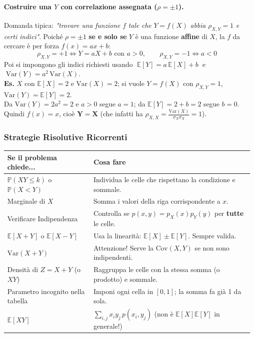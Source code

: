 \documentclass[12pt]{extarticle} %
\begin{document}
\paragraph{Costruire una $Y$ con correlazione assegnata ($\rho = \pm 1$).} Domanda tipica: \emph{"trovare una funzione $f$ tale che $Y = f(X)$ abbia $\rho_{X,Y} = 1$ e certi indici"}. Poiché $\rho = \pm1$ \textbf{se e solo se} $Y$ è una funzione \textbf{affine} di $X$, la $f$ da cercare è per forza $f(x) = ax+b$:
$$ \rho_{X,Y} = +1 \iff Y = aX + b \text{ con } a > 0, \qquad \rho_{X,Y} = -1 \iff a < 0 $$
Poi si impongono gli indici richiesti usando $\;\mathbb{E}[Y] = a\,\mathbb{E}[X] + b\;$ e $\;\mathrm{Var}(Y) = a^2\,\mathrm{Var}(X)$. \\
{\footnotesize \textbf{Es.} $X$ con $\mathbb{E}[X] = 2$ e $\mathrm{Var}(X) = 2$; si vuole $Y = f(X)$ con $\rho_{X,Y} = 1$, $\mathrm{Var}(Y) = \mathbb{E}[Y] = 2$. \\
Da $\mathrm{Var}(Y) = 2a^2 = 2$ e $a>0$ segue $a = 1$; da $\mathbb{E}[Y] = 2 + b = 2$ segue $b = 0$. Quindi $f(x) = x$, cioè $\mathbf{Y = X}$ (che infatti ha $\rho_{X,X} = \frac{\mathrm{Var}(X)}{\sigma_X \sigma_X} = 1$).}

\newpage

\subsubsection{Strategie Risolutive Ricorrenti}
\begin{table}[h]
\centering
\begin{tabular}{|l|l|}
\hline
\textbf{Se il problema chiede...} & \textbf{Cosa fare} \\ \hline
$\mathbb{P}(XY \le k)$ o $\mathbb{P}(X < Y)$ & Individua le celle che rispettano la condizione e sommale. \\ \hline
Marginale di $X$ & Somma i valori della riga corrispondente a $x$. \\ \hline
Verificare Indipendenza & Controlla se $p(x,y) = p_X(x)p_Y(y)$ per \textbf{tutte} le celle. \\ \hline
$\mathbb{E}[X+Y]$ o $\mathbb{E}[X-Y]$ & Usa la linearità: $\mathbb{E}[X] \pm \mathbb{E}[Y]$. Sempre valida. \\ \hline
$\mathrm{Var}(X+Y)$ & Attenzione! Serve la $\mathrm{Cov}(X,Y)$ se non sono indipendenti. \\ \hline
Densità di $Z = X+Y$ (o $XY$) & Raggruppa le celle con la stessa somma (o prodotto) e sommale. \\ \hline
Parametro incognito nella tabella & Imponi ogni cella in $[0,1]$; la somma fa già 1 da sola. \\ \hline
$\mathbb{E}[XY]$ & $\sum_{i,j} x_i y_j \, p(x_i,y_j)$ \; (non è $\mathbb{E}[X]\mathbb{E}[Y]$ in generale!) \\ \hline
\end{tabular}
\end{table}
\end{document}
